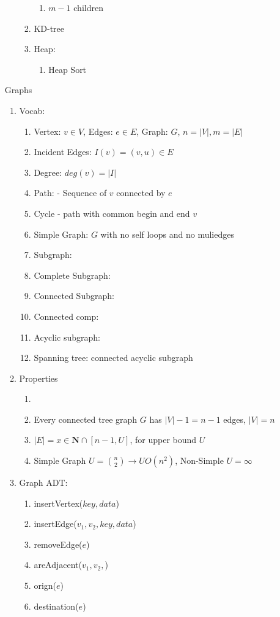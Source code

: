 \documentclass[12pt]{article}
\newcommand{\abs}[1]{\left| #1 \right|} %
\renewcommand{\=}[1]{\stackrel{#1}{=}} %
\theoremstyle{definition}
\theoremstyle{remark}
\begin{document}
\begin{enumerate}
\begin{enumerate}
\begin{enumerate}
\begin{enumerate}
        \item $m-1$ children
        \end{enumerate}
      \item KD-tree
      \item Heap:
        \begin{enumerate}
        \item Heap Sort
        \end{enumerate}
      \end{enumerate}
    \end{enumerate}
    Graphs
    \begin{enumerate}
    \item Vocab:
      \begin{enumerate}
      \item Vertex: $v\in V$, Edges: $e\in E$, Graph: $G$, $n=
        \abs{V}, m = \abs{E}$
      \item Incident Edges: $I(v) = {(v,u) \in E}$
      \item Degree: $deg(v) = \abs{I}$
      \item Path: - Sequence of $v$ connected by $e$
      \item Cycle - path with common begin and end $v$
      \item Simple Graph: $G$ with no self loops and no muliedges
      \item Subgraph:
      \item Complete Subgraph:
      \item Connected Subgraph:
      \item Connected comp:
      \item Acyclic subgraph:
      \item Spanning tree: connected acyclic subgraph
      \end{enumerate}

    \item Properties
      \begin{enumerate}\item 
      \item Every connected tree graph $G$ has $\abs{V}-1= n-1$ edges,
        $\abs{V} = n$
      \item $\abs{E} = {x\in \mathbf{N}\cap[n-1,U]}$, for upper bound $U$
      \item Simple Graph $U=\binom{n}{2} \rightarrow U O(n^2)$,
        Non-Simple $U=\infty$
      \end{enumerate}

    \item Graph ADT:
      \begin{enumerate}
      \item insertVertex($key, data$)
      \item insertEdge($v_1,v_2,key,data$)
      \item removeEdge($e$)
      \item areAdjacent($v_1,v_2,$)
      \item orign($e$)
      \item destination($e$)
      \end{enumerate}


\end{enumerate}
\end{enumerate}
\end{document}
